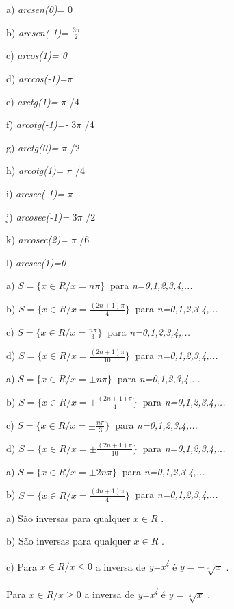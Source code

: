 \begin{respostas}{7}
\ansitem{}
\begin{multicols}{3}
a) \textit{arcsen(0)}= 0

b) \textit{arcsen(-1)}=  \(  \frac{3 \pi }{2} \)

c) \textit{arcos(1)= 0}

d) \textit{arccos(-1)=}$ \pi $

e) \textit{arctg(1)= }$ \pi $ /4

f) \textit{arcotg(-1)=-} 3$ \pi $ /4

g) \textit{arctg(0)=} $ \pi $ /2

h) \textit{arcotg(1)=} $ \pi $ /4

i) \textit{arcsec(-1)=} $ \pi $

j) \textit{arcosec(-1)=} 3$ \pi $ /2

k) \textit{arcosec(2)=} $ \pi $ /6

l) \textit{arcsec(1)=0}
\end{multicols}

\ansitem{} a)  \( S= \{ x \in R /x =n \pi  \} ~  \) para \textit{n=0,1,2,3,4,...}

b) \( S= \{ x \in R /x =\frac{ \left( 2n+1 \right)  \pi }{4} \} ~  \) para \textit{n=0,1,2,3,4,...}

c) \( S= \{ x \in R /x =\frac{n \pi }{3} \} ~  \) para \textit{n=0,1,2,3,4,...}

d) \( S= \{ x \in R /x =\frac{ \left( 2n+1 \right)  \pi }{10} \} ~  \) para \textit{n=0,1,2,3,4,...}

\ansitem{} a) \( S= \{ x \in R /x = \pm n \pi  \} ~  \) para \textit{n=0,1,2,3,4,...}

b) \( S= \{ x \in R /x = \pm \frac{ \left( 2n+1 \right)  \pi }{4} \} ~  \) para \textit{n=0,1,2,3,4,...}

c) \( S= \{ x \in R /x = \pm \frac{n \pi }{3} \} ~  \) para \textit{n=0,1,2,3,4,...}

d) \( S= \{ x \in R /x = \pm \frac{ \left( 2n+1 \right)  \pi }{10} \} ~  \) para \textit{n=0,1,2,3,4,...}

\ansitem{} a)   \( S= \{ x \in R /x = \pm 2n \pi  \} ~  \) para \textit{n=0,1,2,3,4,...}

b)  \( S= \{ x \in R /x =\frac{ \left( 4n+1 \right)  \pi }{4} \} ~  \) para \textit{n=0,1,2,3,4,...}

\ansitem{} a) São inversas para qualquer  \( x \in R  \) .

b) São inversas para qualquer  \( x \in R  \) .

c) Para  \( x \in R/ x  \leq 0 \)   a inversa de \textit{y=x\textsuperscript{4}   } é    \( y=-\sqrt[4]{x} \) .

Para  \( x \in R/ x  \geq 0 \)   a inversa de \textit{y=x\textsuperscript{4}   } é    \( y=\sqrt[4]{x} \) .
\end{respostas}